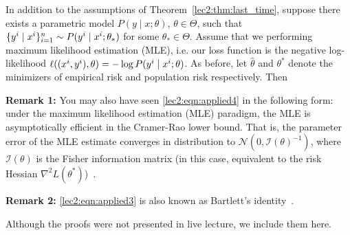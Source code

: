 \begin{theorem}
\label{lec2:thm:applied}
    In addition to the assumptions of Theorem~\ref{lec2:thm:last_time}, suppose there exists a parametric model $P(y \mid x; \theta)$, $\theta \in \Theta$, such that $\{ y\sp{i} \mid x\sp{i} \}_{i=1}^n \sim P( y\sp{i} \mid x\sp{i} ; \theta_*)$ for some $\theta_* \in \Theta$. Assume that we performing maximum likelihood estimation (MLE), i.e. our loss function is the negative log-likelihood $\ell((x\sp{i}, y\sp{i}), \theta) = - \log P( y\sp{i} \mid x\sp{i} ; \theta)$. As before, let $\hat\theta$ and $\theta^*$ denote the minimizers of empirical risk and population risk respectively. Then
    \al{
    \label{lec2:eqn:applied1}
        \theta^* = \theta_*,
    }
\end{theorem}

\textbf{Remark 1:} You may also have seen \eqref{lec2:eqn:applied4} in the following form: under the maximum likelihood estimation (MLE) paradigm, the MLE is asymptotically efficient in the Cramer-Rao lower bound. That is, the parameter error of the MLE estimate converges in distribution to $\mathcal{N}(0, \mathcal{I}(\theta)^{-1})$, where $\mathcal{I}(\theta)$ is the Fisher information matrix (in this case, equivalent to the risk Hessian $\nabla^2 L(\theta^*)$)~\cite{rice2006mathematical}.

\textbf{Remark 2:} \eqref{lec2:eqn:applied3} is also known as Bartlett's identity~\cite{percynotes}.

Although the proofs were not presented in live lecture, we include them here.


